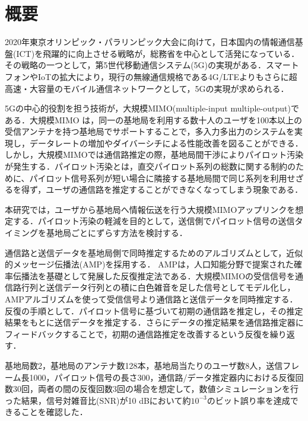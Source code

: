 \chapter*{概要}
2020年東京オリンピック・パラリンピック大会に向けて，日本国内の情報通信基盤(ICT)を飛躍的に向上させる戦略が，総務省を中心として活発になっている．その戦略の一つとして，第5世代移動通信システム(5G)の実現がある．スマートフォンやIoTの拡大により，現行の無線通信規格である4G/LTEよりもさらに超高速・大容量のモバイル通信ネットワークとして，5Gの実現が求められる．

5Gの中心的役割を担う技術が，大規模MIMO(multiple-input multiple-output)である．大規模MIMO は，同一の基地局を利用する数十人のユーザを100本以上の受信アンテナを持つ基地局でサポートすることで，多入力多出力のシステムを実現し，データレートの増加やダイバーシチによる性能改善を図ることができる．しかし，大規模MIMOでは通信路推定の際，基地局間干渉によりパイロット汚染が発生する．パイロット汚染とは，直交パイロット系列の総数に関する制約のために、パイロット信号系列が短い場合に隣接する基地局間で同じ系列を利用せざるを得ず，ユーザの通信路を推定することができなくなってしまう現象である．

本研究では，ユーザから基地局へ情報伝送を行う大規模MIMOアップリンクを想定する．パイロット汚染の軽減を目的として，送信側でパイロット信号の送信タイミングを基地局ごとにずらす方法を検討する．

通信路と送信データを基地局側で同時推定するためのアルゴリズムとして，近似的メッセージ伝播法(AMP)を採用する． AMPは，人口知能分野で提案された確率伝播法を基礎として発展した反復推定法である．大規模MIMOの受信信号を通信路行列と送信データ行列との積に白色雑音を足した信号としてモデル化し，AMPアルゴリズムを使って受信信号より通信路と送信データを同時推定する．反復の手順として．パイロット信号に基づいて初期の通信路を推定し，その推定結果をもとに送信データを推定する．さらにデータの推定結果を通信路推定器にフィードバックすることで，初期の通信路推定を改善するという反復を繰り返す．

基地局数2，基地局のアンテナ数128本，基地局当たりのユーザ数8人，送信フレーム長1000，パイロット信号の長さ300，通信路/データ推定器内における反復回数30回，両者の間の反復回数3回の場合を想定して，数値シミュレーションを行った結果，信号対雑音比(SNR)が10 dBにおいて約$10^{-3}$のビット誤り率を達成できることを確認した．
